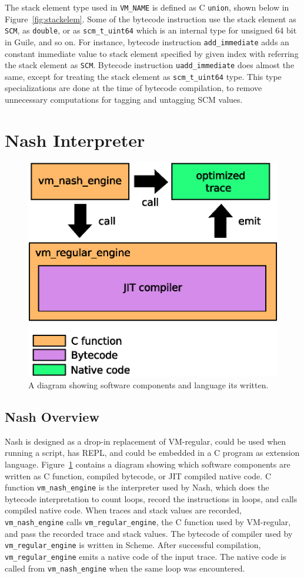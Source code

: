 \documentclass[preprint, 10pt]{sigplanconf}
\begin{document}
The stack element type used in \texttt{VM\_NAME} is defined as C \texttt{union},
shown below in Figure~\hyperref[fig:stackelem]{\ref{fig:stackelem}}. Some of
the bytecode instruction use the stack element as \texttt{SCM}, as
\texttt{double}, or as \texttt{scm\_t\_uint64} which is an internal type for
unsigned 64 bit in Guile, and so on. For instance, bytecode instruction
\texttt{add\_immediate} adds an constant immediate value to stack element
specified by given index with referring the stack element as
\texttt{SCM}. Bytecode instruction \texttt{uadd\_immediate} does almost the
same, except for treating the stack element as \texttt{scm\_t\_uint64}
type. This type specializations are done at the time of bytecode compilation, to
remove unnecessary computations for tagging and untagging SCM values.

\section{Nash Interpreter}
\label{sec:interpreter}

\begin{figure}
  \centering
  \includegraphics[width=0.4 \textwidth]{overview}
  \caption{A diagram showing software components and language its written.}
\label{fig:overview}
\end{figure}

\subsection{Nash Overview}

Nash is designed as a drop-in replacement of VM-regular, could be used when
running a script, has REPL, and could be embedded in a C program as extension
language. Figure~\hyperref[fig:overview]{\ref{fig:overview}} contains a diagram
showing which software components are written as C function, compiled bytecode,
or JIT compiled native code. C function \texttt{vm\_nash\_engine} is the
interpreter used by Nash, which does the bytecode interpretation to count loops,
record the instructions in loops, and calls compiled native code. When traces
and stack values are recorded, \texttt{vm\_nash\_engine} calls
\texttt{vm\_regular\_engine}, the C function used by VM-regular, and pass the
recorded trace and stack values. The bytecode of compiler used by
\texttt{vm\_regular\_engine} is written in Scheme. After successful compilation,
\texttt{vm\_regular\_engine} emits a native code of the input trace. The native
code is called from \texttt{vm\_nash\_engine} when the same loop was
encountered.
\end{document}

